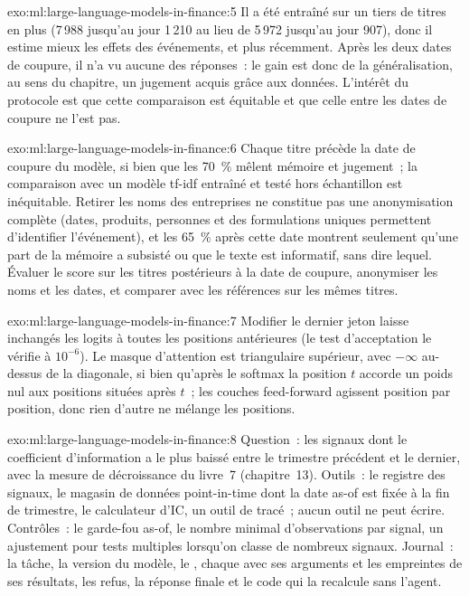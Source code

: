 \begin{solution}{exo:ml:large-language-models-in-finance:5}
Il a été entraîné sur un tiers de titres en plus (7\,988 jusqu'au jour 1\,210 au lieu de 5\,972 jusqu'au jour 907), donc il estime mieux les effets des événements, et plus
récemment. Après les deux dates de coupure, il n'a vu aucune des réponses~: le gain est donc de la généralisation, au sens du
chapitre, un jugement acquis grâce aux données. L'intérêt du protocole est que cette comparaison est équitable et que celle entre les dates de coupure ne l'est pas.
\end{solution}

\begin{solution}{exo:ml:large-language-models-in-finance:6}
Chaque titre précède la date de coupure du modèle, si bien que les 70~\% mêlent mémoire et jugement~; la comparaison avec un modèle tf-idf
entraîné et testé hors échantillon est inéquitable. Retirer les noms des entreprises ne constitue pas une anonymisation complète (dates, produits, personnes
et des formulations uniques permettent d'identifier l'événement), et les 65~\% après cette date montrent seulement qu'une part de la mémoire a subsisté ou que le texte est
informatif, sans dire lequel. Évaluer le score sur les titres postérieurs à la date de coupure, anonymiser les noms et les dates, et comparer avec les références sur les
mêmes titres.
\end{solution}

\begin{solution}{exo:ml:large-language-models-in-finance:7}
Modifier le dernier jeton laisse inchangés les logits à toutes les positions antérieures (le test d'acceptation le vérifie à $10^{-6}$).
Le masque d'attention est triangulaire supérieur, avec $-\infty$ au-dessus de la diagonale, si bien qu'après le softmax la position $t$ accorde un poids nul
aux positions situées après $t$~; les couches feed-forward agissent position par position, donc rien d'autre ne mélange les positions.
\end{solution}

\begin{solution}{exo:ml:large-language-models-in-finance:8}
Question~: les signaux dont le coefficient d'information a le plus baissé entre le trimestre précédent et le dernier, avec la
mesure de décroissance du livre~7 (chapitre~13). Outils~: le registre des signaux, le magasin de données point-in-time dont la date as-of est fixée à la
fin de trimestre, le calculateur d'IC, un outil de tracé~; aucun outil ne peut écrire. Contrôles~: le garde-fou as-of, le nombre minimal
d'observations par signal, un ajustement pour tests multiples lorsqu'on classe de nombreux signaux. Journal~: la tâche, la version du modèle, le ,
chaque  avec ses arguments et les empreintes de ses résultats, les refus, la réponse finale et le code qui la recalcule sans
l'agent.
\end{solution}

